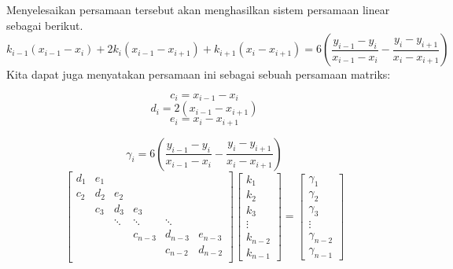 \documentclass[journal,12pt,onecolumn,a4paper]{IEEEtran}
\begin{document}
Menyelesaikan persamaan tersebut akan menghasilkan sistem persamaan linear sebagai berikut.
\begin{equation}
	k_{i-1}(x_{i-1} - x_i) + 2k_i(x_{i-1} - x_{i+1}) + k_{i+1}(x_i - x_{i+1}) = 6(\frac{y_{i-1}-y_i}{x_{i-1}-x_i} - \frac{y_i-y_{i+1}}{x_i - x_{i+1}})
\end{equation}
Kita dapat juga menyatakan persamaan ini sebagai sebuah persamaan matriks:
\begin{multicols}{3}
	\noindent
	\begin{equation*}
		c_i = x_{i-1} - x_i
	\end{equation*}
	\begin{equation*}
		d_i = 2(x_{i-1} - x_{i+1})
	\end{equation*}
	\begin{equation*}
		e_i = x_i - x_{i+1}
	\end{equation*}
\end{multicols}
\begin{equation*}
	\gamma_i = 6(\frac{y_{i-1}-y_i}{x_{i-1}-x_i} - \frac{y_i-y_{i+1}}{x_i - x_{i+1}})
\end{equation*}
\begin{equation}
	\begin{bmatrix}
		d_1 & e_1 &        &         &         &         \\
		c_2 & d_2 & e_2    &         &         &         \\
		    & c_3 & d_3    & e_3     &         &         \\
		    &     & \ddots & \ddots  & \ddots  &         \\
		    &     &        & c_{n-3} & d_{n-3} & e_{n-3} \\
		    &     &        &         & c_{n-2} & d_{n-2} \\
	\end{bmatrix}
	\begin{bmatrix}
		k_1 \\k_2\\k_3\\\vdots\\k_{n-2}\\k_{n-1}
	\end{bmatrix}
	=
	\begin{bmatrix}
		\gamma_1 \\\gamma_2\\\gamma_3\\\vdots\\\gamma_{n-2}\\\gamma_{n-1}
	\end{bmatrix}
\end{equation}
\end{document}
